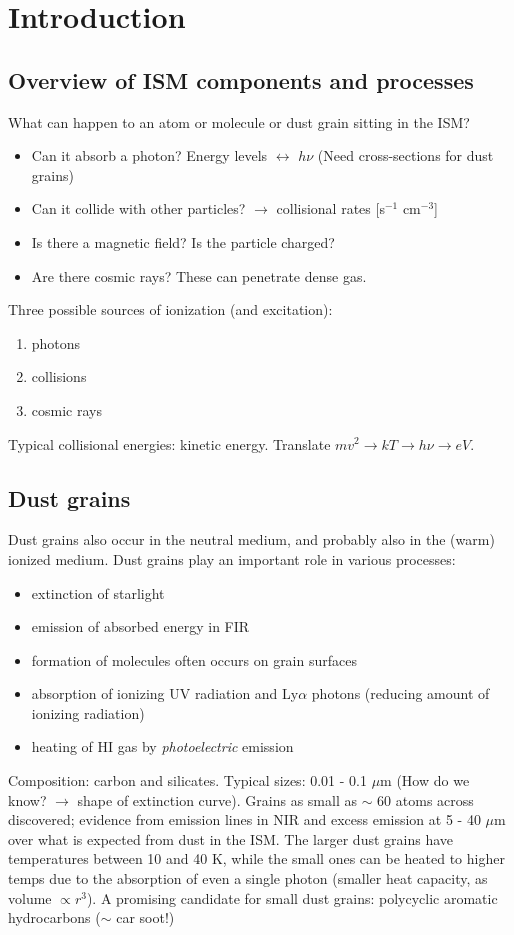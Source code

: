 \documentclass[11pt]{article}
\newcommand{\mar}[1]{\hspace{0pt}\marginpar{-\textcolor{black}{#1}-}}
\let\oldsection\section
\renewcommand\section{\clearpage\oldsection}
\begin{document}
\setlength{\parskip}{0ex}
\tableofcontents\newpage
\setlength{\parskip}{2ex}

\reversemarginpar
\section{Introduction}
\subsection{Overview of ISM components and processes}
\mar{6}What can happen to an atom or molecule or dust
grain sitting in the ISM?
\begin{itemize}
    \item Can it absorb a photon? Energy levels $\leftrightarrow$ $h\nu$
        (Need cross-sections for dust grains)
    \item Can it collide with other particles? $\rightarrow$ collisional
        rates [s$^{-1}$ cm$^{-3}$]
    \item Is there a magnetic field? Is the particle charged?
    \item Are there cosmic rays? These can penetrate dense gas.
\end{itemize}
Three possible sources of ionization (and excitation):
\begin{enumerate}
    \item photons
    \item collisions
    \item cosmic rays
\end{enumerate}
Typical collisional energies: kinetic energy.
Translate $mv^{2} \rightarrow kT \rightarrow h\nu \rightarrow eV$.

\subsection{Dust grains}
\mar{8}Dust grains also occur in the neutral medium, and
probably also in the (warm) ionized medium. Dust grains play an important
role in various processes:
\begin{itemize}
    \item extinction of starlight
    \item emission of absorbed energy in FIR
    \item formation of molecules often occurs on grain surfaces
    \item absorption of ionizing UV radiation and Ly$\alpha$ photons
        (reducing amount of ionizing radiation)
    \item heating of HI gas by \emph{photoelectric} emission
\end{itemize}
Composition: carbon and silicates. Typical sizes: 0.01 - 0.1 $\mu$m
(How do we know? $\rightarrow$ shape of extinction curve). Grains as small
as $\sim$ 60 atoms across discovered; evidence from emission lines in NIR
and excess emission at 5 - 40 $\mu$m over what is expected from dust in the ISM\@.
The larger dust grains have temperatures between 10 and 40 K, while the small
ones can be heated to higher temps due to the absorption of even a single
photon (smaller heat capacity, as volume $\propto r^{3}$). A promising
candidate for small dust grains: polycyclic aromatic hydrocarbons
($\sim$ car soot!)
\end{document}
